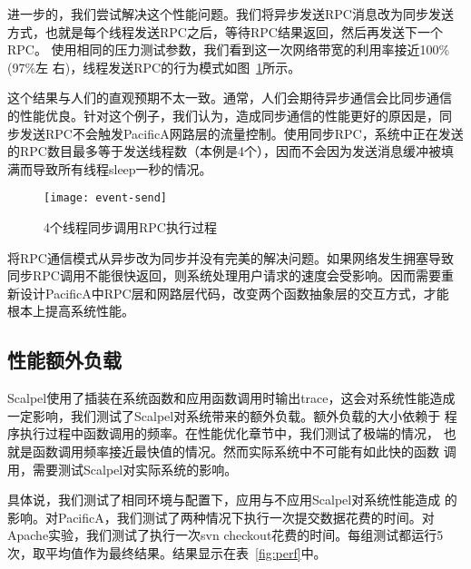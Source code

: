 进一步的，我们尝试解决这个性能问题。我们将异步发送RPC消息改为同步发送
方式，也就是每个线程发送RPC之后，等待RPC结果返回，然后再发送下一个RPC。
使用相同的压力测试参数，我们看到这一次网络带宽的利用率接近100\%(97\%左
右)，线程发送RPC的行为模式如图~\ref{fig:event-send}所示。

这个结果与人们的直观预期不太一致。通常，人们会期待异步通信会比同步通信
的性能优良。针对这个例子，我们认为，造成同步通信的性能更好的原因是，同
步发送RPC不会触发PacificA网路层的流量控制。使用同步RPC，系统中正在发送
的RPC数目最多等于发送线程数（本例是4个），因而不会因为发送消息缓冲被填
满而导致所有线程sleep一秒的情况。

\begin{figure}[htbp]
  \centering
  \begin{minipage}{0.8\linewidth}
    \centering
    \texttt{[image: event-send]}
    \caption{4个线程同步调用RPC执行过程}
    \label{fig:event-send}
  \end{minipage}
\end{figure}

将RPC通信模式从异步改为同步并没有完美的解决问题。如果网络发生拥塞导致
同步RPC调用不能很快返回，则系统处理用户请求的速度会受影响。因而需要重
新设计PacificA中RPC层和网路层代码，改变两个函数抽象层的交互方式，才能
根本上提高系统性能。


\subsection{性能额外负载}
\label{sec:scp:perf}

Scalpel使用了插装在系统函数和应用函数调用时输出trace，这会对系统性能造成
一定影响，我们测试了Scalpel对系统带来的额外负载。额外负载的大小依赖于
程序执行过程中函数调用的频率。在性能优化章节中，我们测试了极端的情况，
也就是函数调用频率接近最快值的情况。然而实际系统中不可能有如此快的函数
调用，需要测试Scalpel对实际系统的影响。

具体说，我们测试了相同环境与配置下，应用与不应用Scalpel对系统性能造成
的影响。对PacificA，我们测试了两种情况下执行一次提交数据花费的时间。对
Apache实验，我们测试了执行一次svn checkout花费的时间。每组测试都运行5
次，取平均值作为最终结果。结果显示在表~\ref{fig:perf}中。

